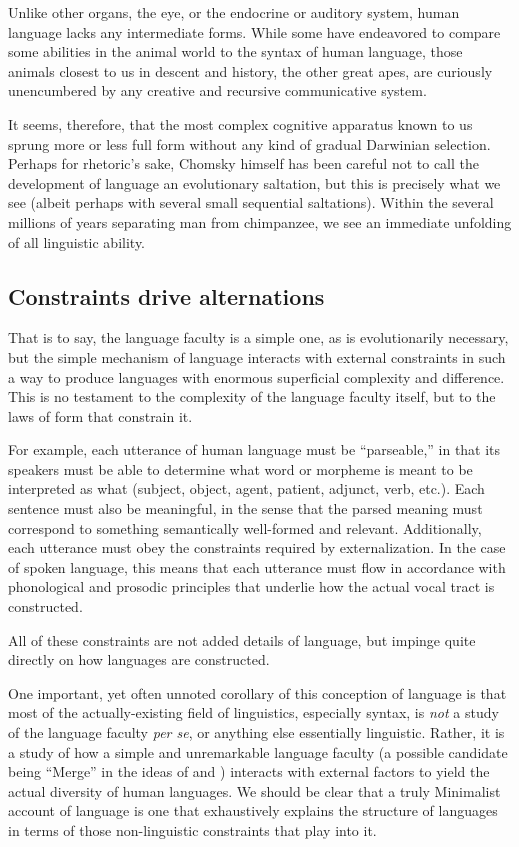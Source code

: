 \documentclass{article}
\begin{document}
Unlike other organs, the eye, or the endocrine or auditory system, human language lacks any intermediate forms. While some have endeavored to compare some abilities in the animal world to the syntax of human language, those animals closest to us in descent and history, the other great apes, are curiously unencumbered by any creative and recursive communicative system.

It seems, therefore, that the most complex cognitive apparatus known to us sprung more or less full form without any kind of gradual Darwinian selection. Perhaps for rhetoric's sake, Chomsky himself has been careful not to call the development of language an evolutionary saltation, but this is precisely what we see (albeit perhaps with several small sequential saltations). Within the several millions of years separating man from chimpanzee, we see an immediate unfolding of all linguistic ability.

\subsection{Constraints drive alternations}

That is to say, the language faculty is a simple one, as is evolutionarily necessary, but the simple mechanism of language interacts with external constraints in such a way to produce languages with enormous superficial complexity and difference. This is no testament to the complexity of the language faculty itself, but to the laws of form that constrain it.

For example, each utterance of human language must be ``parseable,'' in that its speakers must be able to determine what word or morpheme is meant to be interpreted as what (subject, object, agent, patient, adjunct, verb, etc.). Each sentence must also be meaningful, in the sense that the parsed meaning must correspond to something semantically well-formed and relevant. Additionally, each utterance must obey the constraints required by externalization. In the case of spoken language, this means that each utterance must flow in accordance with phonological and prosodic principles that underlie how the actual vocal tract is constructed.

All of these constraints are not added details of language, but impinge quite directly on how languages are constructed.

One important, yet often unnoted corollary of this conception of language is that most of the actually-existing field of linguistics, especially syntax, is \emph{not} a study of the language faculty \textit{per se}, or anything else essentially linguistic. Rather, it is a study of how a simple and unremarkable language faculty (a possible candidate being ``Merge'' in the ideas of \citet{hauser02} and \citet{berwick15}) interacts with external factors to yield the actual diversity of human languages. We should be clear that a truly Minimalist account of language is one that exhaustively explains the structure of languages in terms of those non-linguistic constraints that play into it.
\end{document}
